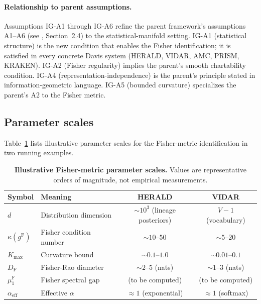 \documentclass[11pt]{article}
\newcommand{\gF}{g^{\mathrm{F}}}
\theoremstyle{remark}
\begin{document}
\paragraph{Relationship to parent assumptions.}
Assumptions IG-A1 through IG-A6 refine the parent framework's assumptions
A1--A6 (see \cite{davis2025manifold}, Section~2.4) to the statistical-manifold
setting.  IG-A1 (statistical structure) is the new condition that enables the
Fisher identification; it is satisfied in every concrete Davis system (HERALD,
VIDAR, AMC, PRISM, KRAKEN).  IG-A2 (Fisher regularity) implies the parent's
smooth chartability condition.  IG-A4 (representation-independence) is the
parent's principle stated in information-geometric language.  IG-A5 (bounded
curvature) specializes the parent's A2 to the Fisher metric.

\subsection{Parameter scales}\label{subsec:param-scales}

Table~\ref{tab:fisher-params} lists illustrative parameter scales for the
Fisher-metric identification in two running examples.

\begin{table}[htbp]
\centering
\caption{\textbf{Illustrative Fisher-metric parameter scales.}  Values are
representative orders of magnitude, not empirical measurements.}
\label{tab:fisher-params}
\begin{tabular}{llcc}
\toprule
Symbol & Meaning & HERALD & VIDAR \\
\midrule
$d$ & Distribution dimension & $\sim 10^3$ (lineage posteriors) & $V - 1$ (vocabulary) \\
$\kappa(\gF)$ & Fisher condition number & $\sim 10$--$50$ & $\sim 5$--$20$ \\
$K_{\max}$ & Curvature bound & $\sim 0.1$--$1.0$ & $\sim 0.01$--$0.1$ \\
$D_{\mathrm{F}}$ & Fisher-Rao diameter & $\sim 2$--$5$ (nats) & $\sim 1$--$3$ (nats) \\
$\mu_1^{\mathrm{F}}$ & Fisher spectral gap & (to be computed) & (to be computed) \\
$\alpha_{\mathrm{eff}}$ & Effective $\alpha$ & $\approx 1$ (exponential) & $\approx 1$ (softmax) \\
\bottomrule
\end{tabular}
\end{table}

\end{document}
